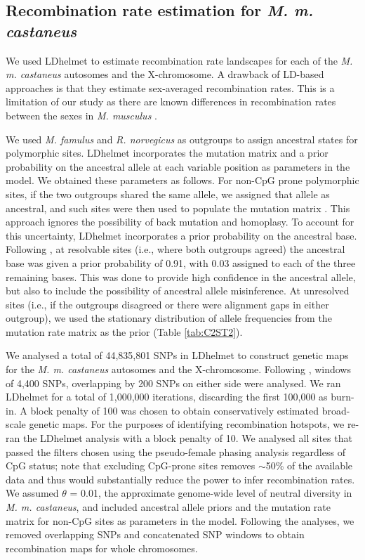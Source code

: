 \subsection{Recombination rate estimation for \textit{\textit{M. m. castaneus}}}
        	
         We used LDhelmet \citep{RN213} to estimate recombination rate landscapes for each of the \textit{M. m. castaneus} autosomes and the X-chromosome. A drawback of LD-based approaches is that they estimate sex-averaged recombination rates. This is a limitation of our study as there are known differences in recombination rates between the sexes in \textit{M. musculus} \citep{RN232,RN266}.
 
        	We used \textit{M. famulus} and \textit{R. norvegicus} as outgroups to assign ancestral states for polymorphic sites. LDhelmet incorporates the mutation matrix and a prior probability on the ancestral allele at each variable position as parameters in the model. We obtained these parameters as follows. For non-CpG prone polymorphic sites, if the two outgroups shared the same allele, we assigned that allele as ancestral, and such sites were then used to populate the mutation matrix \citep{RN213}. This approach ignores the possibility of back mutation and homoplasy. To account for this uncertainty, LDhelmet incorporates a prior probability on the ancestral base. Following \cite{RN258}, at resolvable sites (i.e., where both outgroups agreed) the ancestral base was given a prior probability of 0.91, with 0.03 assigned to each of the three remaining bases. This was done to provide high confidence in the ancestral allele, but also to include the possibility of ancestral allele misinference. At unresolved sites (i.e., if the outgroups disagreed or there were alignment gaps in either outgroup), we used the stationary distribution of allele frequencies from the mutation rate matrix as the prior (Table \ref{tab:C2ST2}).
 
We analysed a total of 44,835,801 SNPs in LDhelmet to construct genetic maps for the \textit{M. m. castaneus} autosomes and the X-chromosome. Following \cite{RN213}, windows of 4,400 SNPs, overlapping by 200 SNPs on either side were analysed. We ran LDhelmet for a total of 1,000,000 iterations, discarding the first 100,000 as burn-in. A block penalty of 100 was chosen to obtain conservatively estimated broad-scale genetic maps. For the purposes of identifying recombination hotspots, we re-ran the LDhelmet analysis with a block penalty of 10. We analysed all sites that passed the filters chosen using the pseudo-female phasing analysis regardless of CpG status; note that excluding CpG-prone sites removes $\sim$50\% of the available data and thus would substantially reduce the power to infer recombination rates. We assumed $\theta$ = 0.01, the approximate genome-wide level of neutral diversity in \textit{M. m. castaneus}, and included ancestral allele priors and the mutation rate matrix for non-CpG sites as parameters in the model. Following the analyses, we removed overlapping SNPs and concatenated SNP windows to obtain recombination maps for whole chromosomes. 

